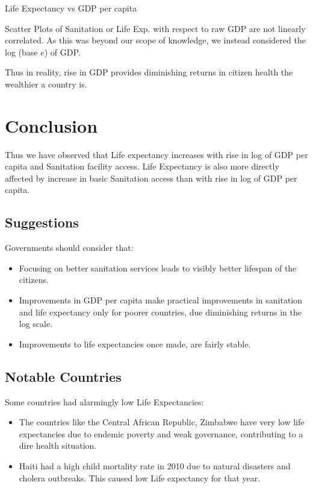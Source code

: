 \documentclass[
]{article}
\begin{document}
Life Expectancy vs GDP per capita

Scatter Plots of Sanitation or Life Exp. with respect to raw GDP are not
linearly correlated. As this was beyond our scope of knowledge, we
instead considered the log (base \(e\)) of GDP.

Thus in reality, rise in GDP provides diminishing returns in citizen
health the wealthier a country is.

\hypertarget{conclusion}{%
\section{Conclusion}\label{conclusion}}

Thus we have observed that Life expectancy increases with rise in log of
GDP per capita and Sanitation facility access. Life Expectancy is also
more directly affected by increase in basic Sanitation access than with
rise in log of GDP per capita.

\hypertarget{suggestions}{%
\subsection{Suggestions}\label{suggestions}}

Governments should consider that:

\begin{itemize}
\item
  Focusing on better sanitation services leads to visibly better
  lifespan of the citizens.
\item
  Improvements in GDP per capita make practical improvements in
  sanitation and life expectancy only for poorer countries, due
  diminishing returns in the log scale.
\item
  Improvements to life expectancies once made, are fairly stable.
\end{itemize}

\hypertarget{notable-countries}{%
\subsection{Notable Countries}\label{notable-countries}}

Some countries had alarmingly low Life Expectancies:

\begin{itemize}
\item
  The countries like the Central African Republic, Zimbabwe have very
  low life expectancies due to endemic poverty and weak governance,
  contributing to a dire health situation.
\item
  Haiti had a high child mortality rate in 2010 due to natural disasters
  and cholera outbreaks. This caused low Life expectancy for that year.
\end{itemize}
\end{document}
